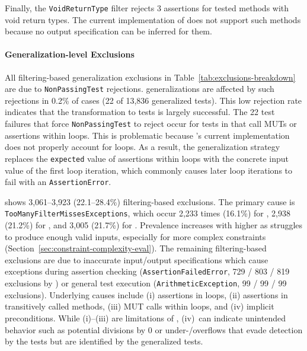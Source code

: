 Finally, the \texttt{VoidReturnType} filter rejects 3 assertions
for tested methods with void return types.
The current implementation of \ToolTeralizer{} does not support such methods
because no output specification can be inferred for them.

\paragraph{Generalization-level Exclusions}
\label{par:generalization-level-exclusions}

All filtering-based generalization exclusions in Table~\ref{tab:exclusions-breakdown}
are due to \texttt{Non\-Passing\-Test} rejections.
\VariantBaseline{} generalizations are affected by such rejections
in 0.2\% of cases (22 of 13,836 generalized tests).
This low rejection rate indicates
that the transformation to \ToolJqwik{} tests is largely successful.
The 22 test failures that force \texttt{NonPassingTest} to reject
occur for tests in \DatasetCommonsDev{}
that call MUTs or assertions within loops.
This is problematic because \ToolTeralizer{}'s current implementation
does not properly account for loops.
As a result, the \VariantBaseline{} generalization strategy
replaces the \texttt{expected} value of assertions within loops
with the concrete input value of the 
first loop iteration, which commonly causes later loop iterations
to fail with an \texttt{AssertionError}.

\VariantNaive{}
shows 3,061--3,923 (22.1--28.4\%) filtering-based exclusions.
The primary cause is \texttt{Too\-Many\-Filter\-Misses\-Exceptions},
which occur 2,233 times (16.1\%) for \VariantNaiveA{},
2,938 (21.2\%) for \VariantNaiveB{},
and 3,005 (21.7\%) for \VariantNaiveC{}.
Prevalence increases with higher \tries{}
as \VariantNaive{} struggles to produce enough valid inputs,
especially for more complex constraints
(Section~\ref{sec:constraint-complexity-eval}).
The remaining filtering-based exclusions are due to 
inaccurate input/output specifications which cause exceptions
during assertion checking (\texttt{AssertionFailedError}, 729 / 803 / 819 exclusions by \VariantNaives{})
or general test execution (\texttt{ArithmeticException}, 99 / 99 / 99 exclusions).
Underlying causes include
(i) assertions in loops,
(ii) assertions in transitively called methods,
(iii) MUT calls within loops,
and (iv) implicit preconditions.
While (i)--(iii) are limitations of \ToolTeralizer{},
(iv)~can indicate unintended behavior
such as potential divisions by 0 or under-/overflows that evade detection
by the \VariantOriginal{} tests but are identified by the generalized tests.


